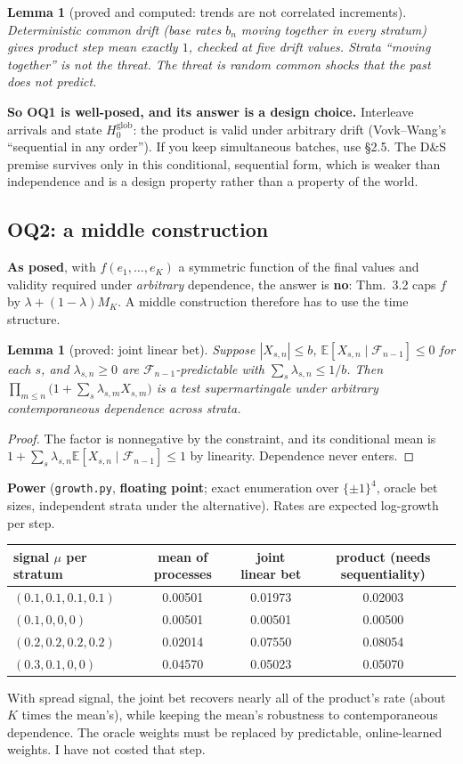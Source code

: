 \documentclass[11pt]{article}
\newtheorem{lemma}[proposition]{Lemma}
\newcommand{\E}{\mathbb{E}}
\newcommand{\Fc}{\mathcal{F}}
\begin{document}
\begin{lemma}[proved and computed: trends are not correlated increments]
Deterministic common drift (base rates $b_n$ moving together in every stratum) gives product step mean exactly $1$, checked at five drift values. Strata ``moving together'' is not the threat. The threat is \emph{random} common shocks that the past does not predict.
\end{lemma}
\textbf{So OQ1 is well-posed, and its answer is a design choice.} Interleave arrivals and state $H_0^{\mathrm{glob}}$: the product is valid under arbitrary drift (Vovk--Wang's ``sequential in any order''). If you keep simultaneous batches, use \S2.5. The D\&S premise survives only in this conditional, sequential form, which is weaker than independence and is a design property rather than a property of the world.

\subsection{OQ2: a middle construction}
\textbf{As posed}, with $f(e_1,\dots,e_K)$ a symmetric function of the final values and validity required under \emph{arbitrary} dependence, the answer is \textbf{no}: Thm.~3.2 caps $f$ by $\lambda+(1-\lambda)M_K$. A middle construction therefore has to use the time structure.
\begin{lemma}[proved: joint linear bet]
Suppose $|X_{s,n}|\le b$, $\E[X_{s,n}\mid\Fc_{n-1}]\le0$ for each $s$, and $\lambda_{s,n}\ge0$ are $\Fc_{n-1}$-predictable with $\sum_s\lambda_{s,n}\le1/b$. Then $\prod_{m\le n}\big(1+\sum_s\lambda_{s,m}X_{s,m}\big)$ is a test supermartingale under \emph{arbitrary contemporaneous dependence} across strata.
\end{lemma}
\begin{proof}
The factor is nonnegative by the constraint, and its conditional mean is $1+\sum_s\lambda_{s,n}\E[X_{s,n}\mid\Fc_{n-1}]\le1$ by linearity. Dependence never enters.
\end{proof}
\textbf{Power} (\texttt{growth.py}, \textbf{floating point}; exact enumeration over $\{\pm1\}^4$, oracle bet sizes, independent strata under the alternative). Rates are expected log-growth per step.
\begin{center}\small
\begin{tabular}{lccc}
\toprule
signal $\mu$ per stratum & mean of processes & joint linear bet & product (needs sequentiality)\\\midrule
$(0.1,0.1,0.1,0.1)$ & 0.00501 & 0.01973 & 0.02003\\
$(0.1,0,0,0)$ & 0.00501 & 0.00501 & 0.00500\\
$(0.2,0.2,0.2,0.2)$ & 0.02014 & 0.07550 & 0.08054\\
$(0.3,0.1,0,0)$ & 0.04570 & 0.05023 & 0.05070\\
\bottomrule
\end{tabular}
\end{center}
With spread signal, the joint bet recovers nearly all of the product's rate (about $K$ times the mean's), while keeping the mean's robustness to contemporaneous dependence. The oracle weights must be replaced by predictable, online-learned weights. I have not costed that step.
\end{document}
